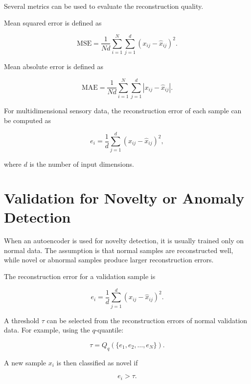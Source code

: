 \documentclass[a4paper]{article}
\begin{document}
        Several metrics can be used to evaluate the reconstruction quality.
        
        Mean squared error is defined as
        
        \[
            \mathrm{MSE}
            =
            \frac{1}{Nd}
            \sum_{i=1}^{N}
            \sum_{j=1}^{d}
            (x_{ij}-\hat{x}_{ij})^2.
        \]
        
        Mean absolute error is defined as
        
        \[
            \mathrm{MAE}
            =
            \frac{1}{Nd}
            \sum_{i=1}^{N}
            \sum_{j=1}^{d}
            \left|x_{ij}-\hat{x}_{ij}\right|.
        \]
        
        For multidimensional sensory data, the reconstruction error of each sample can be computed as
        
        \[
            e_i
            =
            \frac{1}{d}
            \sum_{j=1}^{d}
            (x_{ij}-\hat{x}_{ij})^2,
        \]
        
        where \(d\) is the number of input dimensions.
    
    
    \section{Validation for Novelty or Anomaly Detection}
        
        When an autoencoder is used for novelty detection, it is usually trained only on normal data.
        The assumption is that normal samples are reconstructed well, while novel or abnormal samples produce larger reconstruction errors.
        
        The reconstruction error for a validation sample is
        
        \[
            e_i
            =
            \frac{1}{d}
            \sum_{j=1}^{d}
            (x_{ij}-\hat{x}_{ij})^2.
        \]
        
        A threshold \(\tau\) can be selected from the reconstruction errors of normal validation data.
        For example, using the \(q\)-quantile:
        
        \[
            \tau
            =
            Q_q
            (
            \{e_1,e_2,\dots,e_N\}
            ).
        \]
        
        A new sample \(x_i\) is then classified as novel if
        
        \[
            e_i > \tau.
        \]
        
\end{document}

